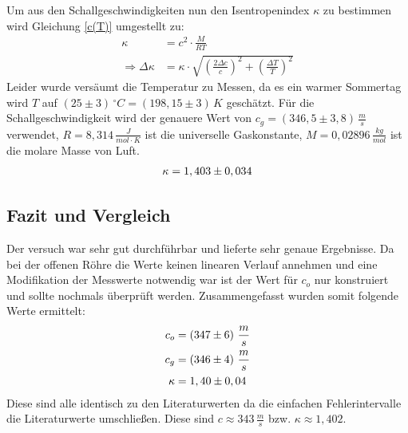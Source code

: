 Um aus den Schallgeschwindigkeiten nun den Isentropenindex \(\kappa\) zu bestimmen wird Gleichung \eqref{c(T)} umgestellt zu:
\begin{align}
\kappa &= c^2 \cdot \frac{M}{RT} \\
\Rightarrow \Delta \kappa &= \kappa \cdot \sqrt{\left(\frac{2\Delta c}{c}\right)^2+ \left(\frac{\Delta T}{T}\right)^2}
\end{align} 
Leider wurde versäumt die Temperatur zu Messen, da es ein warmer Sommertag wird \(T\) auf \((25 \pm 3)\,^\circ C = (198,15 \pm 3)\, K\) geschätzt. Für die Schallgeschwindigkeit wird der genauere Wert von \(c_g = (346,5 \pm 3,8)\, \frac{m}{s}\) verwendet, \(R = 8,314\, \frac{J}{mol\cdot K}\) ist die universelle Gaskonstante, \(M = 0,02896\, \frac{kg}{mol}\) ist die molare Masse von Luft.
\begin{align}
\kappa =  1,403 \pm 0,034 \notag
\end{align} 

\subsection{Fazit und Vergleich}
Der versuch war sehr gut durchführbar und lieferte sehr genaue Ergebnisse. Da bei der offenen Röhre die Werte keinen linearen Verlauf annehmen und eine Modifikation der Messwerte notwendig war ist der Wert für \(c_o\) nur konstruiert und sollte nochmals überprüft werden. Zusammengefasst wurden somit folgende Werte ermittelt:
\begin{align}
c_o &= \left(347 \pm 6 \right)\, \frac{m}{s} \notag \\
c_g &= \left(346 \pm 4 \right)\, \frac{m}{s} \notag \\
\kappa &= 1,40 \pm 0,04 \notag
\end{align}
Diese sind alle identisch zu den Literaturwerten da die einfachen Fehlerintervalle die Literaturwerte umschließen. Diese sind \(c \approx 343\, \frac{m}{s}\) bzw. \(\kappa \approx 1,402\). 

